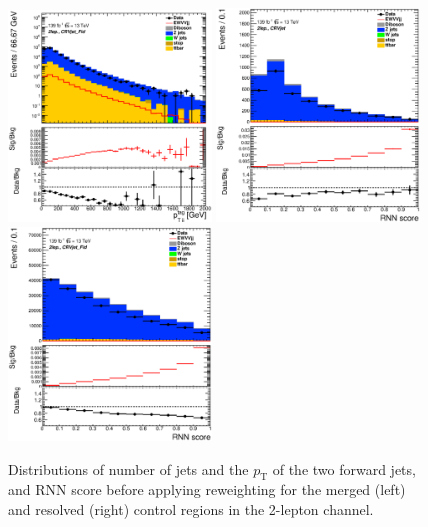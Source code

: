 \begin{figure}[ht]
    \includegraphics[width=0.48\textwidth]{figures/2lep/reweighting/before_reweighting/C_0ptag2pjet_0ptv_CRVjet_Fid_PtTagResJets_Log.eps}
    \includegraphics[width=0.48\textwidth]{figures/2lep/reweighting/before_reweighting/C_0ptag1pfat0pjet_0ptv_CRVjet_RNNScoreMerged_Lin.eps}
    \includegraphics[width=0.48\textwidth]{figures/2lep/reweighting/before_reweighting/C_0ptag2pjet_0ptv_CRVjet_Fid_RNNScoreResolved_Lin.eps}
    \caption{ Distributions of number of jets and the $p_\mathrm{T}$ of the two forward jets, and RNN score before applying reweighting for the merged (left) and resolved (right) control regions in the 2-lepton channel.}
    \label{fig:before_rw}
\end{figure}

